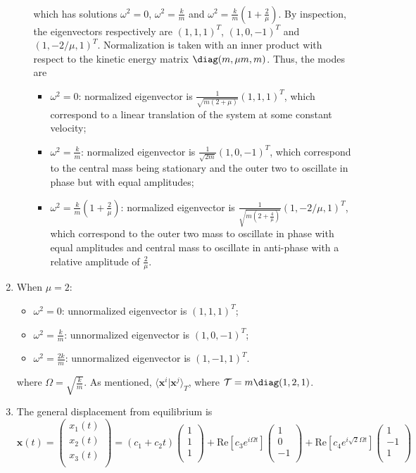 \documentclass[a4paper]{article}
\begin{document}
\begin{ans}
\begin{enumerate}[label=(\alph*)]
\begin{enumerate}[label=(\roman*)]
\begin{align}
\end{align}
which has solutions $\omega^2=0$, $\omega^2=\frac{k}{m}$ and $\omega^2=\frac{k}{m}(1+\frac{2}{\mu})$. By inspection, the eigenvectors respectively are $(1,1,1)^T$, $(1,0,-1)^T$ and $(1,-2/\mu,1)^T$. Normalization is taken with an inner product with respect to the kinetic energy matrix $\diag(m,\mu m,m)$. Thus, the modes are
\begin{itemize}
    \item $\omega^2=0$: normalized eigenvector is $\frac{1}{\sqrt{m(2+\mu)}}(1,1,1)^T$, which correspond to a linear translation of the system at some constant velocity;
    \item $\omega^2=\frac{k}{m}$: normalized eigenvector is $\frac{1}{\sqrt{2m}}(1,0,-1)^T$, which correspond to the central mass being stationary and the outer two to oscillate in phase but with equal amplitudes;
    \item $\omega^2=\frac{k}{m}(1+\frac{2}{\mu})$: normalized eigenvector is $\frac{1}{\sqrt{m(2+\frac{4}{\mu})}}(1,-2/\mu,1)^T$, which correspond to the outer two mass to oscillate in phase with equal amplitudes and central mass to oscillate in anti-phase with a relative amplitude of $\frac{2}{\mu}$.
\end{itemize}
\end{enumerate}
\item When $\mu=2$:
\begin{itemize}
    \item $\omega^2=0$: unnormalized eigenvector is $(1,1,1)^T$;
    \item $\omega^2=\frac{k}{m}$: unnormalized eigenvector is $(1,0,-1)^T$;
    \item $\omega^2=\frac{2k}{m}$: unnormalized eigenvector is $(1,-1,1)^T$.
\end{itemize}
where $\Omega=\sqrt{\frac{k}{m}}$. As mentioned, $\langle\mathbf{x}^i|\mathbf{x}^j\rangle_T$, where $\mathcal{T}=m\diag(1,2,1)$.
\item The general displacement from equilibrium is
$$\mathbf{x}(t)=\begin{pmatrix}x_1(t)\\x_2(t)\\x_3(t)\\\end{pmatrix}=(c_1+c_2t)\begin{pmatrix}1\\1\\1\\\end{pmatrix}+\text{Re}[c_3e^{i\Omega t}]\begin{pmatrix}1\\0\\-1\\\end{pmatrix}+\text{Re}[c_4e^{i\sqrt{2}\Omega t}]\begin{pmatrix}1\\-1\\1\\\end{pmatrix}$$

\end{enumerate}
\end{ans}
\end{document}
